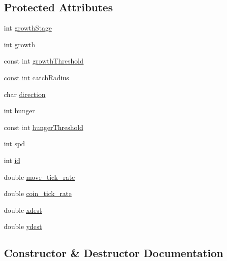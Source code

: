\subsection*{Protected Attributes}
\begin{DoxyCompactItemize}
\item 
int \mbox{\hyperlink{class_ikan_aad3d87c6a66aa4cf3ec9e47b37bc90e3}{growth\+Stage}}
\item 
int \mbox{\hyperlink{class_ikan_a8c8f1efec43b4ae815d88b6472bc81bb}{growth}}
\item 
const int \mbox{\hyperlink{class_ikan_a7eaddebc6127b66ddfad007f49b4ae83}{growth\+Threshold}}
\item 
const int \mbox{\hyperlink{class_ikan_a7d6507a938bda54ba96d224e27a12b71}{catch\+Radius}}
\item 
char \mbox{\hyperlink{class_ikan_ac0fdc43f8926aaa17b0deb0ebfd4cc5b}{direction}}
\item 
int \mbox{\hyperlink{class_ikan_a038bd5c59db6efca6dc0e722a182ff09}{hunger}}
\item 
const int \mbox{\hyperlink{class_ikan_ac9671ac93e29bd9de93f401ecc903ac9}{hunger\+Threshold}}
\item 
int \mbox{\hyperlink{class_ikan_aac75c79c60a94f5607bdc2730203fd6f}{spd}}
\item 
int \mbox{\hyperlink{class_ikan_a9af33ebcd489980e17cbd4b876692e85}{id}}
\item 
double \mbox{\hyperlink{class_ikan_a51d3fe38edbf39ca78308b5d20630a77}{move\+\_\+tick\+\_\+rate}}
\item 
double \mbox{\hyperlink{class_ikan_af6c55901dcc5cfbdcc8b30798949118e}{coin\+\_\+tick\+\_\+rate}}
\item 
double \mbox{\hyperlink{class_ikan_a8c240f6477e1010fa7d70e505bf66ae3}{xdest}}
\item 
double \mbox{\hyperlink{class_ikan_ac338da0dc5dd61ec09b279200f94d328}{ydest}}
\end{DoxyCompactItemize}


\subsection{Constructor \& Destructor Documentation}
\mbox{\label{class_ikan_a0770a992c26f08ba3d9bad79fec71d55}} 
